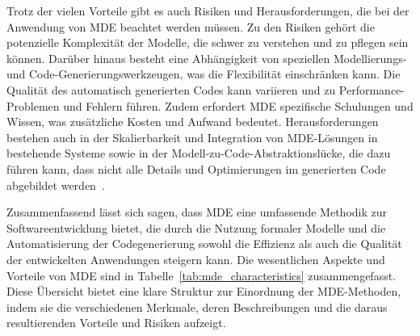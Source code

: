 Trotz der vielen Vorteile gibt es auch Risiken und Herausforderungen, die bei der Anwendung von MDE beachtet werden 
müssen. Zu den Risiken gehört die potenzielle Komplexität der Modelle, die schwer zu verstehen und zu pflegen sein 
können. Darüber hinaus besteht eine Abhängigkeit von speziellen Modellierungs- und Code-Generierungswerkzeugen, was 
die Flexibilität einschränken kann. Die Qualität des automatisch generierten Codes kann variieren und zu 
Performance-Problemen und Fehlern führen. Zudem erfordert MDE spezifische Schulungen und Wissen, was zusätzliche
Kosten und Aufwand bedeutet. Herausforderungen bestehen auch in der Skalierbarkeit und Integration von MDE-Lösungen 
in bestehende Systeme sowie in der Modell-zu-Code-Abstraktionslücke, die dazu führen kann, dass nicht alle Details 
und Optimierungen im generierten Code abgebildet werden~\cite{france2007model}.

Zusammenfassend lässt sich sagen, dass MDE eine umfassende Methodik zur Softwareentwicklung bietet, die durch 
die Nutzung formaler Modelle und die Automatisierung der Codegenerierung sowohl die Effizienz als auch die 
Qualität der entwickelten Anwendungen steigern kann. Die wesentlichen Aspekte und Vorteile von MDE sind 
in Tabelle~\ref{tab:mde_characteristics} zusammengefasst. Diese Übersicht bietet eine klare Struktur zur 
Einordnung der MDE-Methoden, indem sie die verschiedenen Merkmale, deren Beschreibungen und die daraus 
resultierenden Vorteile und Risiken aufzeigt.

